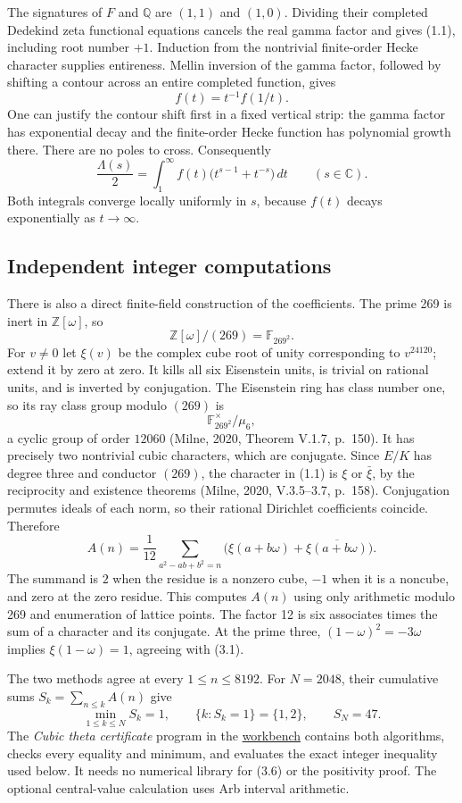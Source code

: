\documentclass[11pt]{article}
\newcommand{\Q}{\mathbb Q}
\newcommand{\Z}{\mathbb Z}
\newcommand{\C}{\mathbb C}
\newcommand{\workbenchurl}{https://github.com/KokunoYumeto/zeta-and-l-functions-workbench}
\begin{document}
The signatures of $F$ and $\Q$ are $(1,1)$ and $(1,0)$. Dividing their completed Dedekind zeta functional equations cancels the real gamma factor and gives (1.1), including root number $+1$. Induction from the nontrivial finite-order Hecke character supplies entireness. Mellin inversion of the gamma factor, followed by shifting a contour across an entire completed function, gives
\[
 f(t)=t^{-1}f(1/t).
 \tag{3.3}
\]
One can justify the contour shift first in a fixed vertical strip: the gamma factor has exponential decay and the finite-order Hecke function has polynomial growth there. There are no poles to cross. Consequently
\[
 \frac{\Lambda(s)}2
  =\int_1^\infty f(t)\bigl(t^{s-1}+t^{-s}\bigr)\,dt
 \qquad(s\in\C).
 \tag{3.4}
\]
Both integrals converge locally uniformly in $s$, because $f(t)$ decays exponentially as $t\to\infty$.

\subsection{Independent integer computations}
There is also a direct finite-field construction of the coefficients. The prime 269 is inert in $\Z[\omega]$, so
\[
 \Z[\omega]/(269)=\mathbb F_{269^2}.
\]
For $v\ne0$ let $\xi(v)$ be the complex cube root of unity corresponding to $v^{24120}$; extend it by zero at zero. It kills all six Eisenstein units, is trivial on rational units, and is inverted by conjugation. The Eisenstein ring has class number one, so its ray class group modulo $(269)$ is
\[
 \mathbb F_{269^2}^{\times}/\mu_6,
\]
a cyclic group of order $12060$ (Milne, 2020, Theorem V.1.7, p.~150). It has precisely two nontrivial cubic characters, which are conjugate. Since $E/K$ has degree three and conductor $(269)$, the character in (1.1) is $\xi$ or $\bar\xi$, by the reciprocity and existence theorems (Milne, 2020, V.3.5--3.7, p.~158). Conjugation permutes ideals of each norm, so their rational Dirichlet coefficients coincide. Therefore
\[
 A(n)=\frac1{12}\sum_{a^2-ab+b^2=n}
       \bigl(\xi(a+b\omega)+\overline{\xi(a+b\omega)}\bigr).
 \tag{3.5}
\]
The summand is $2$ when the residue is a nonzero cube, $-1$ when it is a noncube, and zero at the zero residue. This computes $A(n)$ using only arithmetic modulo 269 and enumeration of lattice points. The factor 12 is six associates times the sum of a character and its conjugate. At the prime three, $(1-\omega)^2=-3\omega$ implies $\xi(1-\omega)=1$, agreeing with (3.1).

The two methods agree at every $1\le n\le8192$. For $N=2048$, their cumulative sums $S_k=\sum_{n\le k}A(n)$ give
\[
 \min_{1\le k\le N}S_k=1,\qquad
 \{k:S_k=1\}=\{1,2\},\qquad S_N=47.
 \tag{3.6}
\]
The \emph{Cubic theta certificate} program in the \href{\workbenchurl}{workbench} contains both algorithms, checks every equality and minimum, and evaluates the exact integer inequality used below. It needs no numerical library for (3.6) or the positivity proof. The optional central-value calculation uses Arb interval arithmetic.
\end{document}
